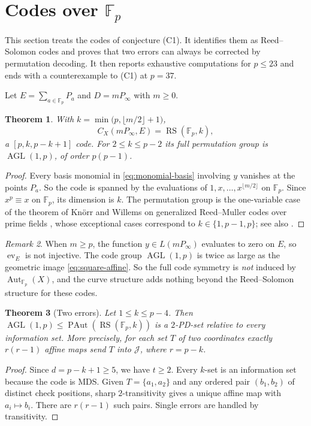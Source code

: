\documentclass[12pt,letterpaper]{article}
\newtheorem{theorem}{Theorem}[section]
\theoremstyle{definition}
\theoremstyle{remark}
\newtheorem{remark}[theorem]{Remark}
\numberwithin{equation}{section}
\newcommand{\F}{\mathbb{F}}
\newcommand{\Aut}{\operatorname{Aut}}
\newcommand{\ev}{\operatorname{ev}}
\newcommand{\RS}{\operatorname{RS}}
\newcommand{\PAut}{\operatorname{PAut}}
\newcommand{\AGL}{\operatorname{AGL}}
\newcommand{\cJ}{\mathcal{J}}
\begin{document}
\section{\texorpdfstring{Codes over $\F_p$}{Codes over F\_p}}\label{sec:RS}

This section treats the codes of conjecture (C1). It identifies them as
Reed--Solomon codes and proves that two errors can always be corrected by
permutation decoding. It then reports exhaustive computations for
$p\le23$ and ends with a counterexample to (C1) at $p=37$.

Let $E=\sum_{a\in\F_p}P_a$ and $D=mP_\infty$ with $m\ge0$.

\begin{theorem}\label{thm:RS}
With $k=\min\bigl(p,\lfloor m/2\rfloor+1\bigr)$,
\[
C_X(mP_\infty,E)=\RS(\F_p,k),
\]
a $[p,k,p-k+1]$ code.  For $2\le k\le p-2$ its full permutation group is
$\AGL(1,p)$, of order $p(p-1)$.
\end{theorem}
\begin{proof}
Every basis monomial in \eqref{eq:monomial-basis} involving $y$ vanishes
at the points $P_a$.  So the code is spanned by the evaluations of
$1,x,\dots,x^{\lfloor m/2\rfloor}$ on $\F_p$.  Since $x^p\equiv x$ on
$\F_p$, its dimension is $k$.  The permutation group is the one-variable
case of the theorem of Kn\"orr and Willems on generalized Reed--Muller
codes over prime fields \cite{KW90}, whose exceptional cases correspond to
$k\in\{1,p-1,p\}$; see also \cite{CLLS25,BC93}.
\end{proof}

\begin{remark}\label{rem:RSkernel}
When $m\ge p$, the function $y\in L(mP_\infty)$ evaluates to zero on
$E$, so $\ev_E$ is not injective.  The code group $\AGL(1,p)$ is twice
as large as the geometric image \eqref{eq:square-affine}.  So the full
code symmetry is \emph{not} induced by $\Aut_{\F_p}(X)$, and the curve
structure adds nothing beyond the Reed--Solomon structure for these codes.
\end{remark}

\begin{theorem}[Two errors]\label{thm:two-pd}
Let $1\le k\le p-4$.  Then $\AGL(1,p)\le\PAut(\RS(\F_p,k))$ is a
$2$-PD-set relative to every information set.  More precisely, for each
set $T$ of two coordinates exactly $r(r-1)$ affine maps send $T$ into
$\cJ$, where $r=p-k$.
\end{theorem}
\begin{proof}
Since $d=p-k+1\ge5$, we have $t\ge2$.  Every $k$-set is an information
set because the code is MDS.  Given $T=\{a_1,a_2\}$ and any ordered pair
$(b_1,b_2)$ of distinct check positions, sharp $2$-transitivity gives a
unique affine map with $a_i\mapsto b_i$.  There are $r(r-1)$ such pairs.
Single errors are handled by transitivity.
\end{proof}
\end{document}
